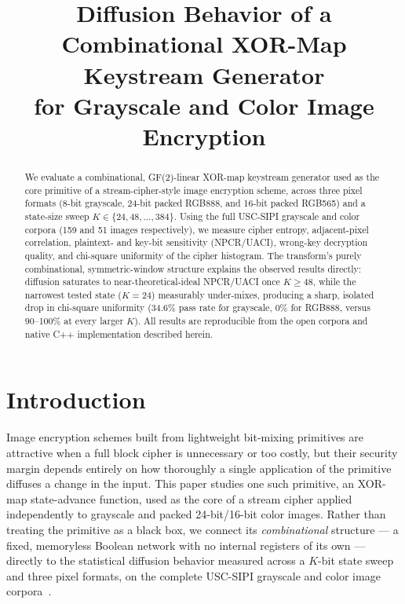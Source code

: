 \documentclass[conference]{IEEEtran}
\begin{document}
\title{Diffusion Behavior of a Combinational XOR-Map Keystream Generator\\
for Grayscale and Color Image Encryption}

\author{
}

\maketitle

\begin{abstract}
We evaluate a combinational, GF(2)-linear XOR-map keystream generator used
as the core primitive of a stream-cipher-style image encryption scheme,
across three pixel formats (8-bit grayscale, 24-bit packed RGB888, and
16-bit packed RGB565) and a state-size sweep $K \in \{24, 48, \dots,
384\}$. Using the full USC-SIPI grayscale and color corpora (159 and 51
images respectively), we measure cipher entropy, adjacent-pixel
correlation, plaintext- and key-bit sensitivity (NPCR/UACI), wrong-key
decryption quality, and chi-square uniformity of the cipher histogram. The
transform's purely combinational, symmetric-window structure explains the
observed results directly: diffusion saturates to near-theoretical-ideal
NPCR/UACI once $K \geq 48$, while the narrowest tested state ($K=24$)
measurably under-mixes, producing a sharp, isolated drop in chi-square
uniformity (34.6\% pass rate for grayscale, 0\% for RGB888, versus
90--100\% at every larger $K$). All results are reproducible from the
open corpora and native C++ implementation described herein.
\end{abstract}

\section{Introduction}

Image encryption schemes built from lightweight bit-mixing primitives are
attractive when a full block cipher is unnecessary or too costly, but
their security margin depends entirely on how thoroughly a single
application of the primitive diffuses a change in the input. This paper
studies one such primitive, an XOR-map state-advance function, used as the
core of a stream cipher applied independently to grayscale and packed
24-bit/16-bit color images. Rather than treating the primitive as a black
box, we connect its \emph{combinational} structure — a fixed, memoryless
Boolean network with no internal registers of its own — directly to the
statistical diffusion behavior measured across a $K$-bit state sweep and
three pixel formats, on the complete USC-SIPI grayscale and color image
corpora~\cite{sipi}.
\end{document}
